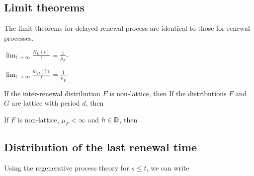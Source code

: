 \documentclass[a4paper,10pt,english]{article}
\begin{document}
\subsection{Limit theorems}
The limit theorems for delayed renewal process are identical to those for renewal processes. 
\begin{lem} 
$\lim_{t \to \infty} \frac{N_D(t)}{t} = \frac{1}{\mu_F}$. 
\end{lem}
\begin{lem} 
$\lim_{t \to \infty} \frac{m_D(t)}{t} = \frac{1}{\mu_F}$.
\end{lem}
\begin{lem} 
If the inter-renewal distribution $F$ is non-lattice, then 
If the distributions $F$ and $G$ are lattice with period $d$, then 
\end{lem}
\begin{lem}
If $F$ is non-lattice, $\mu_F < \infty$ and $h \in \mathbb{D}$, then
\end{lem}

\subsection{Distribution of the last renewal time}
Using the regenerative process theory for $s \leq t$, we can write
 
\end{document}
